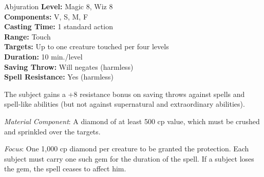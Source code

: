 {Abjuration}
{
	\textbf{Level:}
	Magic 8, Wiz 8\\
	\textbf{Components:}
	V, S, M, F\\
	\textbf{Casting Time:}
	1 standard action\\
	\textbf{Range:}
	Touch\\
	\textbf{Targets:}
	Up to one creature touched per four levels\\
	\textbf{Duration:}
	10 min./level\\
	\textbf{Saving Throw:}
	Will negates (harmless)\\
	\textbf{Spell Resistance:}
	Yes (harmless)\\
}
{
	The subject gains a +8 resistance bonus on saving throws against spells and spell-like abilities (but not against supernatural and extraordinary abilities).

	\textit{Material Component}:
	A diamond of at least 500 cp value, which must be crushed and sprinkled over the targets.

	\textit{Focus}:
	One 1,000 cp diamond per creature to be granted the protection. Each subject must carry one such gem for the duration of the spell. If a subject loses the gem, the spell ceases to affect him.

}

